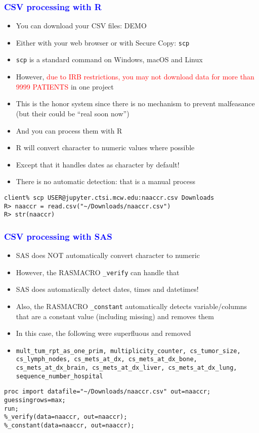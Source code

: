 \documentclass[11pt,pdftex,dvipsnames,usenames]{beamer}
\begin{document}
\begin{frame}[fragile]\frametitle{\bf\textcolor{blue}{CSV processing with R}}
\begin{itemize}
\item You can download your CSV files: DEMO
\item Either with your web browser or with Secure Copy: \texttt{scp}
\item \texttt{scp} is a standard command on Windows, macOS and Linux
\item However, \textcolor{red}{due to IRB restrictions, 
you may not download data
for more than 9999 PATIENTS} in one project
\item This is the honor system since there is no mechanism
to prevent malfeasance (but their could be ``real soon now'')
\item And you can process them with R
\item R will convert character to numeric values where possible
\item Except that it handles dates as character by default!
\item There is no automatic detection: that is a manual process
\end{itemize}
\begin{verbatim}
client% scp USER@jupyter.ctsi.mcw.edu:naaccr.csv Downloads
R> naaccr = read.csv("~/Downloads/naaccr.csv")
R> str(naaccr)
\end{verbatim}

\end{frame}

\begin{frame}[fragile]\frametitle{\bf\textcolor{blue}{CSV processing with SAS}}
\begin{itemize}
\item SAS does NOT automatically convert character to numeric
\item However, the RASMACRO \texttt{\_verify} can handle that
\item SAS does automatically detect dates, times and datetimes!
\item Also, the RASMACRO \texttt{\_constant} automatically detects
variable/columns that are a constant value (including missing) and
removes them
\item In this case, the following were superfluous and removed
\item \texttt{mult\_tum\_rpt\_as\_one\_prim, multiplicity\_counter, 
cs\_tumor\_size, cs\_lymph\_nodes, cs\_mets\_at\_dx, cs\_mets\_at\_dx\_bone, 
cs\_mets\_at\_dx\_brain, cs\_mets\_at\_dx\_liver, cs\_mets\_at\_dx\_lung, 
sequence\_number\_hospital}
\end{itemize}
\begin{verbatim}
proc import datafile="~/Downloads/naaccr.csv" out=naaccr;
guessingrows=max;
run;
%_verify(data=naaccr, out=naaccr);
%_constant(data=naaccr, out=naaccr);
\end{verbatim}

\end{frame}
\end{document}
